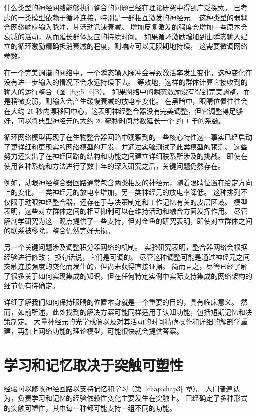 什么类型的神经网络能够执行整合的问题已经在理论研究中得到广泛探索。 
已考虑的一类模型依赖于循环连接，特别是一群相互激发的神经元。 
这种类型的弱耦合网络响应输入脉冲，其活动迅速衰减。 
增加反复激发的强度会增加一些原本会衰减的活动，从而延长群体反应的持续时间。
如果循环激励增加到由瞬态输入建立的循环激励精确抵消衰减的程度，则响应可以无限期地持续。 这需要微调网络参数。


在一个完美调谐的网络中，一个瞬态输入脉冲会导致激活率发生变化，这种变化在没有进一步输入的情况下会永远持续下去。 
等效地，这样的群体计算它接收到的输入的运行整合（图~\ref{fig:5_6}B）。
如果网络中的瞬态激励没有得到完美调整，而是稍微变弱，则输入会产生缓慢衰减的放电率变化。 
在黑暗中，眼睛位置往往会在大约 20 秒内漂移回中心，这表明神经整合器没有完美调整，但它调整得足够好，可以将典型神经元的大约 20 毫秒时间常数延长一个 约 1 千的系数。


循环网络模型再现了在生物整合器回路中观察到的一些核心特性这一事实已经启动了更详细和更现实的网络模型的开发，并通过实验测试了此类模型的预测。
这些努力还突出了在神经回路的结构和功能之间建立详细联系所涉及的挑战。
即使在使用各种系统和方法进行了数十年的深入研究之后，关键问题仍然存在。


例如，动眼神经整合器回路通常包含两类相反的神经元，随着眼睛位置在给定方向上的变化，一类神经元的放电率增加，另一类神经元的放电率降低。 
这种排列不仅限于动眼神经整合器，还存在于与决策制定和工作记忆有关的皮层区域。
模型表明，这些对立群体之间的相互抑制可以在维持活动和融合方面发挥作用。 
尽管解剖学研究为这一观点提供了一些支持，但对金鱼的研究表明，即使对立群体之间的联系被移除，整合仍然完好无损。


另一个关键问题涉及调整积分器网络的机制。
实验研究表明，整合器网络会根据经验进行修改；
换句话说，它们是可调的。 
尽管这种调整可能是通过神经元之间突触连接强度的变化而发生的，但尚未获得直接证据。 
简而言之，尽管已经了解了很多关于如何实现集成的知识，但在任何特定实例中实际支持集成的网络架构的细节仍有待确定。


详细了解我们如何保持眼睛的位置本身就是一个重要的目的，具有临床意义。 
然而，如前所述，此处找到的解决方案可能同样适用于认知功能，包括短期记忆和决策制定。
大量神经元的光学成像以及对其活动的时间精确操作和详细的解剖学重建，再加上网络功能的理论模型，可能很快就会提供答案。



\section{学习和记忆取决于突触可塑性}

经验可以修改神经回路以支持记忆和学习（第~\ref{chap:chap3}~章）。
人们普遍认为，负责学习和记忆的经验依赖性变化主要发生在突触上。
已经确定了多种形式的突触可塑性，其中每一种都可能支持一组不同的功能。


